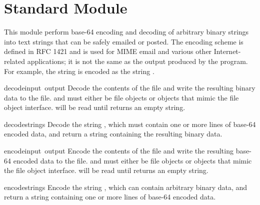 \section{Standard Module }
\label{module-base64}

This module perform base-64 encoding and decoding of arbitrary binary
strings into text strings that can be safely emailed or posted.  The
encoding scheme is defined in RFC 1421 and is used for MIME email and
various other Internet-related applications; it is not the same as the
output produced by the  program.  For example, the
string  is encoded as the string
.  

\renewcommand{\indexsubitem}{(in module base64)}

\begin{funcdesc}{decode}{input\, output}
Decode the contents of the  file and write the resulting
binary data to the  file.
 and  must either be file objects or objects that
mimic the file object interface.  will be read until
 returns an empty string.
\end{funcdesc}

\begin{funcdesc}{decodestring}{s}
Decode the string , which must contain one or more lines of
base-64 encoded data, and return a string containing the resulting
binary data.
\end{funcdesc}

\begin{funcdesc}{encode}{input\, output}
Encode the contents of the  file and write the resulting
base-64 encoded data to the  file.
 and  must either be file objects or objects that
mimic the file object interface.  will be read until
 returns an empty string.
\end{funcdesc}

\begin{funcdesc}{encodestring}{s}
Encode the string , which can contain arbitrary binary data,
and return a string containing one or more lines of
base-64 encoded data.
\end{funcdesc}


